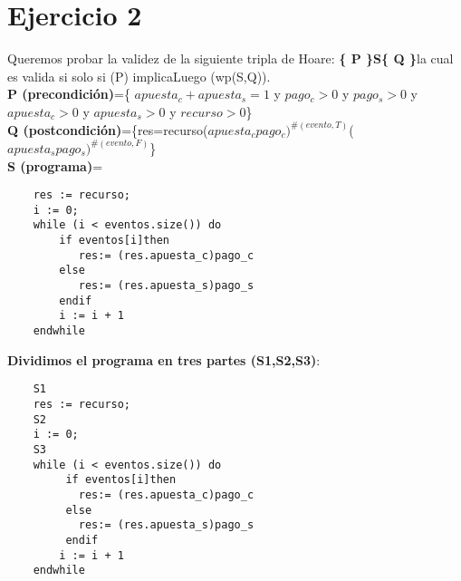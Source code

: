 \documentclass[10pt,a4paper]{article}
\begin{document}
\section{Ejercicio 2}
\begin{flushleft}
Queremos probar  la validez de la siguiente tripla de Hoare:
\textbf{\{ P \}S\{ Q \}}la cual es valida si solo si {(P) implicaLuego (wp(S,Q))}.\\
\vspace{3mm}
\textbf{P (precondición)}=\{ $apuesta_c + apuesta_s =1$ y $pago_c>0$ y $pago_s>0$ y $apuesta_c>0$ y $apuesta_s>0$ y $recurso>0$\}\\
\vspace{3mm}
\textbf{Q (postcondición)}=\{res=recurso($apuesta_cpago_c)^{\#(evento,T)}$($apuesta_spago_s)^{\#(evento,F)}$\}\\
\vspace{30mm}
\textbf{S (programa)}=
\begin{lstlisting}
	res := recurso;
	i := 0;
	while (i < eventos.size()) do
	    if eventos[i]then
		   res:= (res.apuesta_c)pago_c
		else
		   res:= (res.apuesta_s)pago_s
		endif
		i := i + 1
	endwhile
		\end{lstlisting} 

\vspace{3mm}
\textbf{Dividimos el programa en tres partes (S1,S2,S3)}:\\
\begin{lstlisting}
	S1
	res := recurso;
	S2
	i := 0;
	S3
	while (i < eventos.size()) do
	     if eventos[i]then
		   res:= (res.apuesta_c)pago_c
		 else
		   res:= (res.apuesta_s)pago_s
		 endif
		i := i + 1
	endwhile
		\end{lstlisting} 


\end{flushleft}
\end{document}
